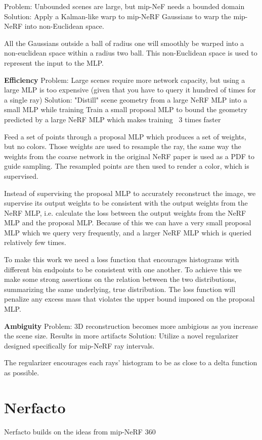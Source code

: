 Problem: Unbounded scenes are large, but mip-NeF needs a bounded domain
Solution: Apply a Kalman-like warp to mip-NeRF Gaussians to warp the mip-NeRF into non-Euclidean space.

All the Gaussians outside a ball of radius one will smoothly be warped into a non-euclidean space within a radius two ball. This non-Euclidean space is used to represent the input to the MLP. 

\textbf{Efficiency}
Problem: Large scenes require more network capacity, but using a large MLP is too expensive (given that you have to query it hundred of times for a single ray)
Solution: "Distill" scene geometry from a large NeRF MLP into a small MLP while training
Train a small proposal MLP to bound the geometry predicted by a large NeRF MLP which makes training ~3 times faster

Feed a set of points through a proposal MLP which produces a set of weights, but no colors. Those weights are used to resample the ray, the same way the weights from the coarse network in the original NeRF paper is used as a PDF to guide sampling. The resampled points are then used to render a color, which is supervised. 

Instead of supervising the proposal MLP to accurately reconstruct the image, we supervise its output weights to be consistent with the output weights from the NeRF MLP, i.e. calculate the loss between the output weights from the NeRF MLP and the proposal MLP. Because of this we can have a very small proposal MLP which we query very frequently, and a larger NeRF MLP which is queried relatively few times.

To make this work we need a loss function that encourages histograms with different bin endpoints to be consistent with one another. To achieve this we make some strong assertions on the relation between the two distributions, summarizing the same underlying, true distribution. The loss function will penalize any excess mass that violates the upper bound imposed on the proposal MLP.

\textbf{Ambiguity}
Problem: 3D reconstruction becomes more ambigious as you increase the scene size. Results in more artifacts
Solution: Utilize a novel regularizer designed specifically for mip-NeRF ray intervals.

The regularizer encourages each rays' histogram to be as close to a delta function as possible. 


\section{Nerfacto}
Nerfacto builds on the ideas from mip-NeRF 360


